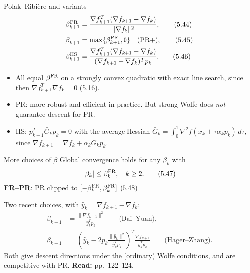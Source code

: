 \documentclass[12pt,aspectratio=169]{beamer}
\newcommand{\readpp}[1]{{\color{red!80!black}\textbf{Read:} #1}}
\begin{document}
\begin{frame}{Polak--Ribi\`ere and variants}
  \begin{align}
    \beta_{k+1}^{\rm PR} &= \frac{\nabla f_{k+1}^T(\nabla f_{k+1}-\nabla f_k)}{\|\nabla f_k\|^2}, \tag{5.44}\\
    \beta_{k+1}^{+} &= \max\{\beta_{k+1}^{\rm PR},0\} \quad\text{(PR+)}, \tag{5.45}\\
    \beta_{k+1}^{\rm HS} &= \frac{\nabla f_{k+1}^T(\nabla f_{k+1}-\nabla f_k)}{(\nabla f_{k+1}-\nabla f_k)^Tp_k}. \tag{5.46}
  \end{align}
  \begin{itemize}
    \item All equal $\beta^{\rm FR}$ on a strongly convex quadratic with exact line search, since then $\nabla f_{k+1}^T\nabla f_k=0$ (5.16).
    \item PR: more robust and efficient in practice. But strong Wolfe does \emph{not} guarantee descent for PR.
    \item HS: $p_{k+1}^T\bar G_kp_k=0$ with the average Hessian $\bar G_k=\int_0^1\nabla^2f(x_k+\tau\alpha_kp_k)\,d\tau$,
      since $\nabla f_{k+1}=\nabla f_k+\alpha_k\bar G_kp_k$.
  \end{itemize}
\end{frame}

\begin{frame}{More choices of $\beta$}
  Global convergence holds for any $\beta_k$ with
  \begin{equation}
    |\beta_k|\le\beta_k^{\rm FR}, \quad k\ge2. \tag{5.47}
  \end{equation}
  \textbf{FR--PR}: PR clipped to $[-\beta_k^{\rm FR},\beta_k^{\rm FR}]$ \hfill (5.48)

  \vspace{1ex}
  Two recent choices, with $\hat y_k=\nabla f_{k+1}-\nabla f_k$:
  \begin{align}
    \beta_{k+1} &= \frac{\|\nabla f_{k+1}\|^2}{\hat y_k^Tp_k} \qquad\text{(Dai--Yuan)}, \tag{5.49}\\
    \beta_{k+1} &= \left(\hat y_k-2p_k\frac{\|\hat y_k\|^2}{\hat y_k^Tp_k}\right)^T\frac{\nabla f_{k+1}}{\hat y_k^Tp_k} \qquad\text{(Hager--Zhang)}. \tag{5.50}
  \end{align}
  Both give descent directions under the (ordinary) Wolfe conditions, and are competitive with PR.
  \readpp{pp.~122--124.}
\end{frame}
\end{document}
